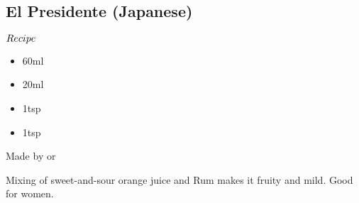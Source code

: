 \subsection{El Presidente (Japanese)}
\begin{itembox}[l]{\boldmath $Recipe$}
\begin{itemize}
\setlength{\parskip}{0cm}
\setlength{\itemsep}{0cm}
\item \rum 60ml
\item \oj 20ml
\item \lj 1tsp
\item \gs 1tsp
\end{itemize}
\vspace{-4mm}
Made by \shake or \stir
\end{itembox}
Mixing of sweet-and-sour orange juice and Rum makes it fruity and mild. Good for women.
